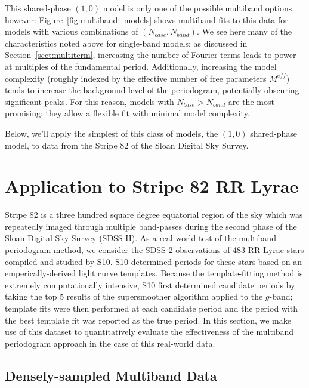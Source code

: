 \documentclass[12pt,preprint]{aastex}
\newcommand{\Fig}[1]{Figure~\ref{fig:#1}}
\newcommand{\fig}[1]{\Fig{#1}}
\newcommand{\Sect}[1]{Section~\ref{sect:#1}}
\newcommand{\sect}[1]{\Sect{#1}}
\begin{document}
This shared-phase $(1,0)$ model is only one of the possible multiband options, however: \fig{multiband_models} shows multiband fits to this data for models with various combinations of $(N_{base},N_{band})$. We see here many of the characteristics noted above for single-band models: as discussed in \sect{multiterm}, increasing the number of Fourier terms leads to power at multiples of the fundamental period. Additionally, increasing the model complexity (roughly indexed by the effective number of free parameters $M^{eff}$) tends to increase the background level of the periodogram, potentially obscuring significant peaks. For this reason, models with $N_{base} > N_{band}$ are the most promising: they allow a flexible fit with minimal model complexity.

Below, we'll apply the simplest of this class of models, the $(1, 0)$ shared-phase model, to data from the Stripe 82 of the Sloan Digital Sky Survey.


\section{Application to Stripe 82 RR Lyrae}

Stripe 82 is a three hundred square degree equatorial region of the sky which was repeatedly imaged through multiple band-passes during the second phase of the Sloan Digital Sky Survey (SDSS II).
As a real-world test of the multiband periodogram method, we consider the SDSS-2 observations of 483 RR Lyrae stars compiled and studied by S10.
S10 determined periods for these stars based on an emperically-derived light curve templates. Because the template-fitting method is extremely computationally intensive, S10 first determined candidate periods by taking the top 5 results of the supersmoother \citep{Reimann94} algorithm applied to the $g$-band; template fits were then performed at each candidate period and the period with the best template fit was reported as the true period. In this section, we make use of this dataset to quantitatively evaluate the effectiveness of the multiband periodogram approach in the case of this real-world data.

\subsection{Densely-sampled Multiband Data}
\end{document}
